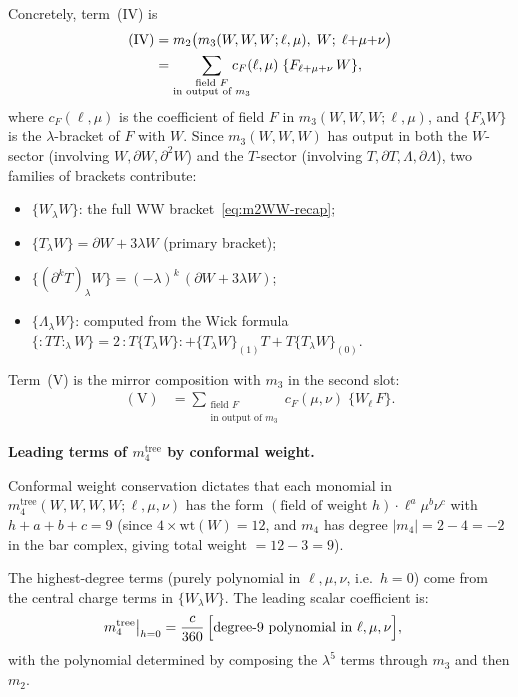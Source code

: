 Concretely, term~(IV) is
\begin{align}
\label{eq:term-IV}
\mathrm{(IV)} &=
m_2\bigl(m_3(W,W,W;\ell,\mu),\; W;\;
 \ell{+}\mu{+}\nu\bigr) \notag\\
&= \sum_{\substack{\text{field } F \\ \text{in output of } m_3}}
\!\!\!\!\!\!\!\!\!
c_F(\ell,\mu)\;\{F_{\ell+\mu+\nu}\, W\},
\end{align}
where $c_F(\ell,\mu)$ is the coefficient of field $F$ in
$m_3(W,W,W;\ell,\mu)$, and $\{F_\lambda W\}$ is the $\lambda$-bracket
of $F$ with $W$. Since $m_3(W,W,W)$ has output in both the
$W$-sector (involving $W, \partial W, \partial^2 W$) and the
$T$-sector (involving $T, \partial T, \Lambda, \partial\Lambda$),
two families of brackets contribute:
\begin{itemize}
\item $\{W_\lambda W\}$: the full WW bracket~\eqref{eq:m2WW-recap};
\item $\{T_\lambda W\} = \partial W + 3\lambda W$ (primary bracket);
\item $\{(\partial^k T)_\lambda W\} = (-\lambda)^k\,(\partial W + 3\lambda W)$;
\item $\{\Lambda_\lambda W\}$: computed from the Wick formula
$\{{:}TT{:}_\lambda W\} = 2\,{:}T\{T_\lambda W\}{:}
+ \{T_\lambda W\}_{(1)} T + T\{T_\lambda W\}_{(0)}$.
\end{itemize}
Term~(V) is the mirror composition with $m_3$ in the second slot:
\begin{align}
\label{eq:term-V}
\mathrm{(V)} &=
\sum_{\substack{\text{field } F \\ \text{in output of } m_3}}
\!\!\!\!\!\!\!\!\!
c_F(\mu,\nu)\;\{W_\ell\, F\}.
\end{align}

\medskip
\noindent\textbf{Leading terms of $m_4^{\mathrm{tree}}$ by
conformal weight.}

\smallskip
Conformal weight conservation dictates that each monomial in
$m_4^{\mathrm{tree}}(W,W,W,W;\ell,\mu,\nu)$ has the form
$(\text{field of weight } h)\cdot \ell^a\mu^b\nu^c$ with
$h + a + b + c = 9$ (since $4 \times \mathrm{wt}(W) = 12$, and
$m_4$ has degree $|m_4| = 2 - 4 = -2$ in the bar complex, giving
total weight $= 12 - 3 = 9$).

The highest-degree terms (purely polynomial in $\ell,\mu,\nu$,
i.e.\ $h = 0$) come from the central charge terms in $\{W_\lambda W\}$.
The leading scalar coefficient is:
\begin{align}
\label{eq:m4-leading-scalar}
m_4^{\mathrm{tree}}\big|_{h=0}
&= \frac{c}{360}\,\Bigl[
 \text{degree-$9$ polynomial in $\ell,\mu,\nu$}
 \Bigr],
\end{align}
with the polynomial determined by composing the $\lambda^5$ terms
through $m_3$ and then $m_2$.

